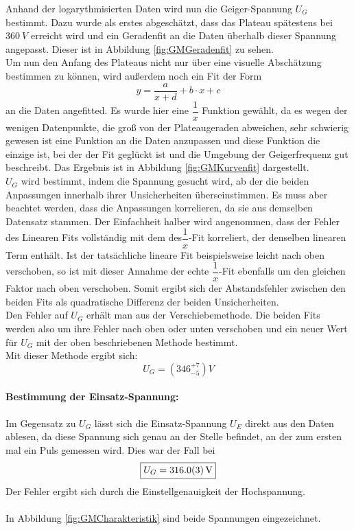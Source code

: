 \documentclass[12pt,a4paper]{article}
\begin{document}
Anhand der logarythmisierten Daten wird nun die Geiger-Spannung $U_G$ bestimmt. Dazu  wurde als erstes abgeschätzt, dass das Plateau spätestens bei $\SI{360}{V}$ erreicht wird und ein Geradenfit an die Daten überhalb dieser Spannung angepasst. Dieser ist in Abbildung \ref{fig:GMGeradenfit} zu sehen.\\
Um nun den Anfang des Plateaus nicht nur über eine visuelle Abschätzung bestimmen zu können, wird außerdem noch ein Fit der Form
\begin{equation*}
y = \dfrac{a}{x+d} + b\cdot x + c
\end{equation*}
an die Daten angefitted. Es wurde hier eine $\dfrac{1}{x}$ Funktion gewählt, da es wegen der wenigen Datenpunkte, die groß von der Plateaugeraden abweichen, sehr schwierig gewesen ist eine Funktion an die Daten anzupassen und diese Funktion die einzige ist, bei der der Fit geglückt ist und die Umgebung der Geigerfrequenz gut beschreibt. Das Ergebnis ist in Abbildung \ref{fig:GMKurvenfit} dargestellt.\\
$U_G$ wird bestimmt, indem die Spannung gesucht wird, ab der die beiden Anpassungen innerhalb ihrer Unsicherheiten überseinstimmen. Es muss aber beachtet werden, dass die Anpassungen korrelieren, da sie aus demselben Datensatz stammen. Der Einfachheit halber wird angenommen, dass der Fehler des Linearen Fits vollständig mit dem des$\dfrac{1}{x}$-Fit korreliert, der denselben linearen Term enthält. Ist der tatsächliche lineare Fit beispielsweise leicht nach oben verschoben, so ist mit dieser Annahme der echte $\dfrac{1}{x}$-Fit ebenfalls um den gleichen Faktor nach oben verschoben. Somit ergibt sich der Abstandsfehler zwischen den beiden Fits als quadratische Differenz der beiden Unsicherheiten.\\
Den Fehler auf $U_G$ erhält man aus der Verschiebemethode. Die beiden Fits werden also um ihre Fehler nach oben oder unten verschoben und ein neuer Wert für $U_G$ mit der oben beschriebenen Methode bestimmt.\\
Mit dieser Methode ergibt sich:
\begin{equation*}
\boxed{U_G = (346_{-5}^{+7})\si{V}}
\end{equation*}
\paragraph{Bestimmung der Einsatz-Spannung:}
Im Gegensatz zu $U_G$ lässt sich die Einsatz-Spannung $U_E$ direkt aus den Daten ablesen, da diese Spannung sich genau an der Stelle befindet, an der zum ersten mal ein Puls gemessen wird. Dies war der Fall bei
\begin{equation*}
\boxed{U_G = \SI{316.0\pm 0.3}{V}}
\end{equation*}
Der Fehler ergibt sich durch die Einstellgenauigkeit der Hochspannung.\\
\\
In Abbildung \ref{fig:GMCharakteristik} sind beide Spannungen eingezeichnet.
\end{document}
